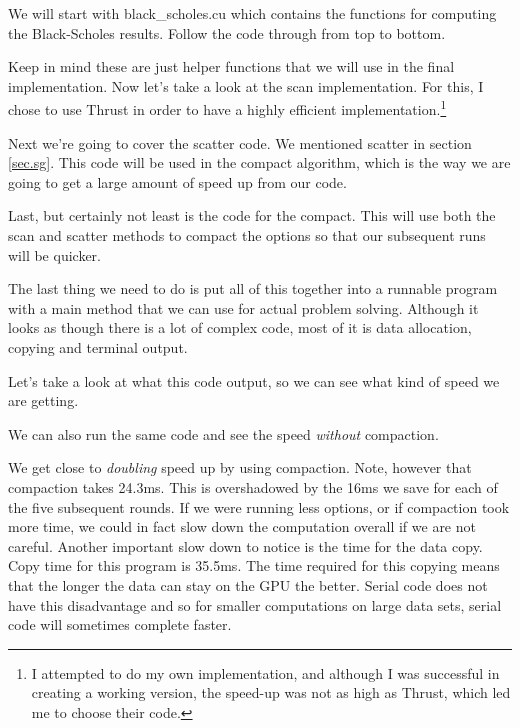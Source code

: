 \documentclass{article}
\newcommand{\comp}[1]{{\ttfamily #1}}
\begin{document}
  We will start with \comp{black\_scholes.cu} which contains the functions for computing the Black-Scholes results. Follow the code through from top to bottom.

  

  Keep in mind these are just helper functions that we will use in the final implementation. Now let's take a look at the scan implementation. For this, I chose to use Thrust in order to have a highly efficient implementation.\footnote{I attempted to do my own implementation, and although I was successful in creating a working version, the speed-up was not as high as Thrust, which led me to choose their code.}

  

  Next we're going to cover the scatter code. We mentioned scatter in section \ref{sec.sg}. This code will be used in the compact algorithm, which is the way we are going to get a large amount of speed up from our code.

  

  Last, but certainly not least is the code for the compact. This will use both the scan and scatter methods to compact the options so that our subsequent runs will be quicker.

  

  The last thing we need to do is put all of this together into a runnable program with a \comp{main} method that we can use for actual problem solving. Although it looks as though there is a lot of complex code, most of it is data allocation, copying and terminal output.

  

  Let's take a look at what this code output, so we can see what kind of speed we are getting.

  

	We can also run the same code and see the speed \emph{without} compaction.

  

  We get close to \emph{doubling} speed up by using compaction. Note, however that compaction takes 24.3ms. This is overshadowed by the 16ms we save for each of the five subsequent rounds. If we were running less options, or if compaction took more time, we could in fact slow down the computation overall if we are not careful. Another important slow down to notice is the time for the data copy. Copy time for this program is 35.5ms. The time required for this copying means that the longer the data can stay on the GPU the better. Serial code does not have this disadvantage and so for smaller computations on large data sets, serial code will sometimes complete faster.
\end{document}

